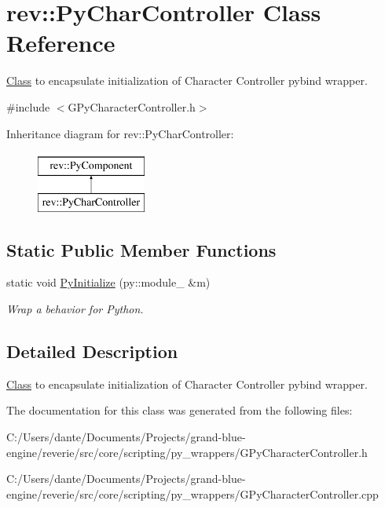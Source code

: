 \hypertarget{classrev_1_1_py_char_controller}{}\section{rev\+::Py\+Char\+Controller Class Reference}
\label{classrev_1_1_py_char_controller}


\mbox{\hyperlink{struct_class}{Class}} to encapsulate initialization of Character Controller pybind wrapper.  




{\ttfamily \#include $<$G\+Py\+Character\+Controller.\+h$>$}

Inheritance diagram for rev\+::Py\+Char\+Controller\+:\begin{figure}[H]
\begin{center}
\leavevmode
\includegraphics[height=2.000000cm]{classrev_1_1_py_char_controller}
\end{center}
\end{figure}
\subsection*{Static Public Member Functions}
\begin{DoxyCompactItemize}
\item 
\mbox{\label{classrev_1_1_py_char_controller_a446cbfdb2196a1111cdde76ccca72063}} 
static void \mbox{\hyperlink{classrev_1_1_py_char_controller_a446cbfdb2196a1111cdde76ccca72063}{Py\+Initialize}} (py\+::module\+\_\+ \&m)
\begin{DoxyCompactList}\small\item\em Wrap a behavior for Python. \end{DoxyCompactList}\end{DoxyCompactItemize}


\subsection{Detailed Description}
\mbox{\hyperlink{struct_class}{Class}} to encapsulate initialization of Character Controller pybind wrapper. 

The documentation for this class was generated from the following files\+:\begin{DoxyCompactItemize}
\item 
C\+:/\+Users/dante/\+Documents/\+Projects/grand-\/blue-\/engine/reverie/src/core/scripting/py\+\_\+wrappers/G\+Py\+Character\+Controller.\+h\item 
C\+:/\+Users/dante/\+Documents/\+Projects/grand-\/blue-\/engine/reverie/src/core/scripting/py\+\_\+wrappers/G\+Py\+Character\+Controller.\+cpp\end{DoxyCompactItemize}
